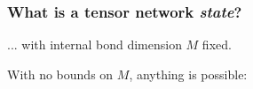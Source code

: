 \begin{frame}
  \frametitle{What is a tensor network {\em state}?}
  \bi
  \item ... with internal bond dimension $M$ fixed.
  \begin{figure}[t]
    \raggedright
    
    \end{figure}
    
    \item With no bounds on $M$, anything is possible:
    \begin{figure}[t]
    \raggedright
    
    \end{figure}
  \ei
\end{frame}
